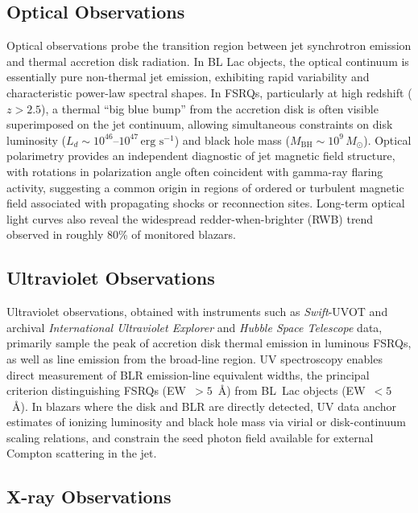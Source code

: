 \documentclass[11pt]{article}
\begin{document}
\subsection{Optical Observations}

Optical observations probe the transition region between jet synchrotron emission and thermal accretion disk radiation. In BL Lac objects, the optical continuum is essentially pure non-thermal jet emission, exhibiting rapid variability and characteristic power-law spectral shapes. In FSRQs, particularly at high redshift ($z > 2.5$), a thermal ``big blue bump'' from the accretion disk is often visible superimposed on the jet continuum, allowing simultaneous constraints on disk luminosity ($L_d \sim 10^{46}$--$10^{47}\,\text{erg s}^{-1}$) and black hole mass ($M_{\text{BH}} \sim 10^{9}\,M_\odot$). Optical polarimetry provides an independent diagnostic of jet magnetic field structure, with rotations in polarization angle often coincident with gamma-ray flaring activity, suggesting a common origin in regions of ordered or turbulent magnetic field associated with propagating shocks or reconnection sites. Long-term optical light curves also reveal the widespread redder-when-brighter (RWB) trend observed in roughly 80\% of monitored blazars.

\subsection{Ultraviolet Observations}

Ultraviolet observations, obtained with instruments such as \textit{Swift}-UVOT and archival \textit{International Ultraviolet Explorer} and \textit{Hubble Space Telescope} data, primarily sample the peak of accretion disk thermal emission in luminous FSRQs, as well as line emission from the broad-line region. UV spectroscopy enables direct measurement of BLR emission-line equivalent widths, the principal criterion distinguishing FSRQs (EW~$>5$~\AA) from BL~Lac objects (EW~$<5$~\AA). In blazars where the disk and BLR are directly detected, UV data anchor estimates of ionizing luminosity and black hole mass via virial or disk-continuum scaling relations, and constrain the seed photon field available for external Compton scattering in the jet.

\subsection{X-ray Observations}
\end{document}
